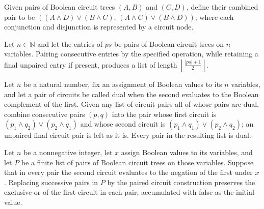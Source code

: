 \begin{definition}
\label{BoolCircuit.xorPairUp}
\leanok
{}
Given pairs of Boolean circuit trees $(A,B)$ and $(C,D)$, define their combined pair to
be $((A\land D)\lor(B\land C),\,(A\land C)\lor(B\land D))$, where each conjunction and
disjunction is represented by a circuit node.
\end{definition}

\begin{theorem}
\label{BoolCircuit.length_xorPairUp}
\leanok
{}
Let $n\in\mathbb{N}$ and let the entries of $ps$ be pairs of Boolean circuit trees on
$n$ variables. Pairing consecutive entries by the specified operation, while retaining a
final unpaired entry if present, produces a list of length
$\left\lfloor\frac{|ps|+1}{2}\right\rfloor$.
\end{theorem}

\begin{theorem}
\label{BoolCircuit.isDual_xorPairUp}
\leanok
{}
Let $n$ be a natural number, fix an assignment of Boolean values to its $n$ variables,
and let a pair of circuits be called dual when the second evaluates to the Boolean
complement of the first. Given any list of circuit pairs all of whose pairs are dual,
combine consecutive pairs $(p,q)$ into the pair whose first circuit is $(p_1\land
q_2)\lor(p_2\land q_1)$ and whose second circuit is $(p_1\land q_1)\lor(p_2\land q_2)$;
an unpaired final circuit pair is left as it is. Every pair in the resulting list is
dual.
\end{theorem}

\begin{theorem}
\label{BoolCircuit.xorAll_xorPairUp}
\leanok
{}
Let $n$ be a nonnegative integer, let $x$ assign Boolean values to its variables, and
let $P$ be a finite list of pairs of Boolean circuit trees on those variables. Suppose
that in every pair the second circuit evaluates to the negation of the first under $x$.
Replacing successive pairs in $P$ by the paired circuit construction preserves the
exclusive-or of the first circuit in each pair, accumulated with false as the initial
value.
\end{theorem}

